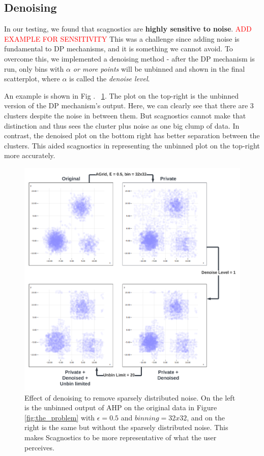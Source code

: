 \documentclass[journal]{vgtc}                     %
\begin{document}
\subsection{Denoising}
In our testing, we found that scagnostics are \textbf{highly sensitive to noise}. \textcolor{red}{ADD EXAMPLE FOR SENSITIVITY} This was a challenge since adding noise is fundamental to DP mechanisms, and it is something we cannot avoid. To overcome this, we implemented a denoising method - after the DP mechanism is run, only bins with \textit{$\alpha$ or more points} will be unbinned and shown in the final scatterplot, where $\alpha$ is called the \textit{denoise level}.
\par An example is shown in Fig . ~\ref{fig:denoising}. The plot on the top-right is the unbinned version of the DP mechanism's output. Here, we can clearly see that there are 3 clusters despite the noise in between them. But scagnostics cannot make that distinction and thus sees the cluster plus noise as one big clump of data. In contrast, the denoised plot on the bottom right has better separation between the clusters. This aided scagnostics in representing the unbinned plot on the top-right more accurately.


\begin{figure}[tbp]%
  \centering %
  \includegraphics[width=\columnwidth]{figs/denoising + unbinlimit.png}
  \caption{%
  	Effect of denoising to remove sparsely distributed noise. On the left is the unbinned output of AHP on the original data in Figure \ref{fig:the_problem} with $\epsilon=0.5$ and $binning=32x32$, and on the right is the same but without the sparsely distributed noise. This makes Scagnostics to be more representative of what the user perceives. %
  }
  \label{fig:denoising}
\end{figure}
\end{document}
